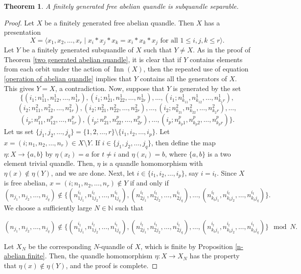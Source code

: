 \documentclass[12pt]{amsart}
\newtheorem{theorem}{Theorem}[section]
\theoremstyle{definition}
\numberwithin{equation}{subsection}
\newcommand{\Inn}{\operatorname{Inn}}
\begin{document}
\begin{theorem}\label{free abelian subquandle sep}
A finitely generated free abelian quandle is subquandle separable.
\end{theorem}

\begin{proof}
Let $X$ be a finitely generated free abelian quandle. Then $X$ has a presentation $$X=\langle x_1, x_2,\dots,x_r\mid x_i*x_j*x_k=x_i*x_k*x_j \text{ for all } 1\leq i,j, k\leq r \rangle.$$ Let $Y$ be a finitely generated subquandle of $X$ such that $Y \ne X$. As in the proof of Theorem \ref{two generated abelian quandle}, it is clear that if $Y$ contains elements from each orbit under the action of $\Inn(X)$, then the repeated use of equation \eqref{operation of abelian quandle} implies that $Y$ contains all the generators of $X$. This gives $Y=X$, a contradiction. Now, suppose that $Y$ is generated by the set
		$$\big\{(i_1;n_{11}^1,n_{12}^1,\dots,n_{1r}^1), (i_1;n_{21}^1,n_{22}^1,\dots,n_{2r}^1),\dots,(i_1;n_{k_11}^1,n_{k_12}^1,\dots,n_{k_1r}^1),$$
		$$(i_2;n_{11}^2,n_{12}^2,\dots,n_{1r}^2), (i_2;n_{21}^2,n_{22}^2, \dots, n_{2r}^2),\dots,(i_2;n_{k_21}^2,n_{k_22}^2,\dots,n_{k_2r}^2), \dots,$$
		$$ (i_p;n_{11}^p,n_{12}^p,\dots,n_{1r}^p), (i_p;n_{21}^p,n_{22}^p,\dots,n_{2r}^p),\dots,(i_p;n_{k_p1}^p,n_{k_p2}^p,\dots,n_{k_pr}^p)\big\}.$$ 
Let us set $\{j_1, j_2, \ldots, j_q\} = \{1, 2, \ldots, r \} \setminus \{i_1, i_2, \ldots, i_p\}$. Let $x=(i;n_1,n_2,\dots,n_r)\in X\setminus Y$. If $i\in \{j_1,j_2,\dots,j_q\}$, then define the map $\eta: X\to \{a,b\}$ by $\eta(x_t)=a$ for $t\neq i$ and $\eta(x_i)=b$, where $\{a,b\}$ is a two element trivial quandle. Then, $\eta$ is a quandle homomorphism with $\eta(x)\notin \eta(Y)$, and we are done. Next, let $i\in \{i_1,i_2,\dots,i_p\}$, say $i=i_t$. Since $X$ is free abelian,  $x=(i;n_1,n_2,\dots,n_r)\notin Y$ if and only if $$(n_{j_1},n_{j_2},\dots,n_{j_q})\notin \{ (n_{1{j_1}}^{i_t},n_{1{j_2}}^{i_t},\dots,n_{1{j_q}}^{i_t}), (n_{2{j_1}}^{i_t},n_{2{j_2}}^{i_t},\dots,n_{2{j_q}}^{i_t}),\dots,(n_{k_t{j_1}}^{i_t},n_{k_t{j_2}}^{i_t},\dots,n_{k_t{j_q}}^{i_t})\}.$$ We choose a sufficiently large $N\in \mathbb{N}$ such that 
\begin{small}
$$(n_{j_1},n_{j_2},\dots,n_{j_q})\notin \{ (n_{1{j_1}}^{i_t},n_{1{j_2}}^{i_t},\dots,n_{1{j_q}}^{i_t}), (n_{2{j_1}}^{i_t},n_{2{j_2}}^{i_t},\dots,n_{2{j_q}}^{i_t}),\dots,(n_{k_t{j_1}}^{i_t},n_{k_t{j_2}}^{i_t},\dots,n_{k_t{j_q}}^{i_t})\} \mod N.$$ 
\end{small}
Let $X_N$ be the corresponding $N$-quandle of $X$, which is finite by Proposition \ref{n-abelian finite}. Then,  the quandle homomorphism $\eta:X\to X_N$ has the property that $\eta(x) \not\in \eta(Y)$, and the proof is complete.
\end{proof}
\end{document}
